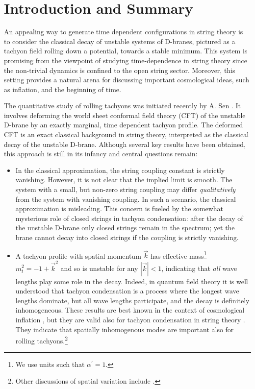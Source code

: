 \documentclass[a4paper,12pt]{article}
\begin{document}
\newpage

\section{Introduction and Summary}
An appealing way to generate time dependent  configurations in string theory is to consider the classical decay of unstable systems of D-branes, pictured as a tachyon field rolling 
down a potential, towards a stable minimum. This system is promising from the viewpoint of studying time-dependence in string theory since the  
non-trivial dynamics is confined to the open string sector. Moreover, this setting provides a natural
arena for discussing important cosmological ideas, such as inflation, and the beginning of time.

The quantitative study of rolling tachyons was initiated recently by A. Sen \cite{Sen1,Sen2,Sen3,senspac,Sen5}. 
It involves deforming
the world sheet conformal field theory (CFT) of  the unstable D-brane by an exactly marginal, 
time dependent tachyon profile. The deformed CFT is an exact classical background in string theory, 
interpreted as the classical decay of the unstable D-brane. Although several key results have 
been obtained, this approach is  still in its infancy and central questions remain: 
\begin{itemize}
\item
In the classical approximation, the string coupling constant is strictly vanishing.  However,
it is not clear that the implied limit  is smooth. The system with  a small, but non-zero string coupling may
 differ {\it qualitatively} from the system with vanishing coupling. In such a scenario,  the classical approximation is misleading. This 
concern is fueled by the somewhat mysterious role of closed strings in tachyon condensation: 
after the decay of the unstable D-brane only closed strings remain in the spectrum; yet the brane 
cannot  decay into closed strings if the coupling is strictly vanishing.
\item
A tachyon profile with 
spatial momentum $\vec{k}$ has effective mass\footnote{We use 
units such that $\alpha^\prime=1$.}  $m^2_t = -1 + {\vec k}^2$ and so is unstable for any $|\vec{k}|<1$, indicating that {\it all} wave lengths play some role in the decay. Indeed,  in 
quantum field theory it is well understood that tachyon condensation is a process where the longest wave lengths dominate, but all wave lengths participate, and  the decay is 
definitely inhomogeneous. These results are best known in the context of  cosmological 
inflation \cite{Guth:1985ya,Weinberg:1987vp}, but they are valid also for tachyon condensation in string theory \cite{Craps:2001jp}. They indicate that spatially inhomogenous modes are
important also for rolling tachyons.\footnote{
Other discussions of spatial variation include \cite{senspac,Felder:2002sv,Mukohyama:2002vq,bckr}.}
\end{itemize}
\end{document}
